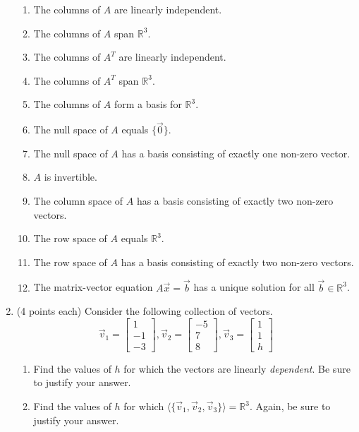 \documentclass[11pt]{article}
\theoremstyle{definition}
\begin{document}
\begin{enumerate}
\begin{enumerate}
\item The columns of $A$ are linearly independent.
\item The columns of $A$ span $\mathbb{R}^3$.
\item The columns of $A^T$ are linearly independent.
\item The columns of $A^T$ span $\mathbb{R}^3$.
\item The columns of $A$ form a basis for $\mathbb{R}^3$.
\item The null space of $A$ equals $\{\vec{0}\}$.
\item The null space of $A$ has a basis consisting of exactly one non-zero vector.
\item $A$ is invertible.
\item The column space of $A$ has a basis consisting of exactly two non-zero vectors.
\item The row space of $A$ equals $\mathbb{R}^3$.
\item The row space of $A$ has a basis consisting of exactly two non-zero vectors.
\item The matrix-vector equation $A\vec{x}=\vec{b}$ has a unique solution for all $\vec{b}\in\mathbb{R}^3$.
\end{enumerate}

\item (4 points each) Consider the following collection of vectors.
  	\[
	\vec{v}_1=\begin{bmatrix}1 \\-1 \\-3\end{bmatrix}, \vec{v}_2=\begin{bmatrix}-5 \\7 \\8\end{bmatrix}, \vec{v}_3=\begin{bmatrix}1 \\1 \\h\end{bmatrix}
	\]
\begin{enumerate}
\item Find the values of $h$ for which the vectors are linearly \emph{dependent}.  Be sure to justify your answer.
  
\item Find the values of $h$ for which $\langle\{ \vec{v}_1, \vec{v}_2, \vec{v}_3\}\rangle=\mathbb{R}^3$.  Again, be sure to justify your answer.
\end{enumerate}


\end{enumerate}
\end{document}
